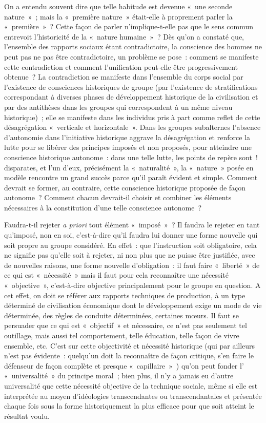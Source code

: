 \documentclass[french,twoside]{book} %
\begin{document}
On a entendu souvent dire que telle habitude est devenue « une seconde nature » ; mais la « première nature » était-elle à proprement parler la « première » ? Cette façon de parler n’implique-t-elle pas que le sens commun entrevoit l’historicité de la « nature humaine » ? Dès qu’on a constaté que, l’ensemble des rapports sociaux étant contradictoire, la conscience des hommes ne peut pas ne pas être contradictoire, un problème se pose : comment se manifeste cette contradiction et comment l’unification peut-elle être progressivement obtenue ? La contradiction se manifeste dans l’ensemble du corps social par l’existence de consciences historiques de groupe (par l’existence de stratifications correspondant à diverses phases de développement historique de la civilisation et par des antithèses dans les groupes qui correspondent à un même niveau historique) ; elle se manifeste dans les individus pris à part comme reflet de cette désagrégation « verticale et horizontale ». Dans les groupes subalternes l’absence d’autonomie dans l’initiative historique aggrave la désagrégation et renforce la lutte pour se libérer des principes imposés et non proposés, pour atteindre une conscience historique autonome : dans une telle lutte, les points de repère sont ! disparates, et l’un d’eux, précisément la « naturalité », la « nature » posée en modèle rencontre un grand succès parce qu’il paraît évident et simple. Comment devrait se former, au contraire, cette conscience historique proposée de façon autonome ? Comment chacun devrait-il choisir et combiner les éléments nécessaires à la constitution d’une telle conscience autonome ?\par
Faudra-t-il rejeter \emph{a priori} tout élément « imposé » ? Il faudra le rejeter en tant qu’imposé, non en soi, c’est-à-dire qu’il faudra lui donner une forme nouvelle qui soit propre au groupe considéré. En effet : que l’instruction soit obligatoire, cela ne signifie pas qu’elle soit à rejeter, ni non plus que ne puisse être justifiée, avec de nouvelles raisons, une forme nouvelle d’obligation : il faut faire « liberté » de ce qui est « nécessité » mais il faut pour cela reconnaître une nécessité « objective », c’est-à-dire objective principalement pour le groupe en question. A cet effet, on doit se référer aux rapports techniques de production, à un type déterminé de civilisation économique dont le développement exige un mode de vie déterminée, des règles de conduite déterminées, certaines mœurs. Il faut se persuader que ce qui est « objectif » et nécessaire, ce n’est pas seulement tel outillage, mais aussi tel comportement, telle éducation, telle façon de vivre ensemble, etc. C'est sur cette objectivité et nécessité historique (qui par ailleurs n’est pas évidente : quelqu’un doit la reconnaître de façon critique, s’en faire le défenseur de façon complète et presque « capillaire » ) qu’on peut fonder l’ « universalité » du principe moral ; bien plus, il n’y a jamais eu d’autre universalité que cette nécessité objective de la technique sociale, même si elle est interprétée au moyen d’idéologies transcendantes ou transcendantales et présentée chaque fois sous la forme historiquement la plus efficace pour que soit atteint le résultat voulu.\par
\end{document}
